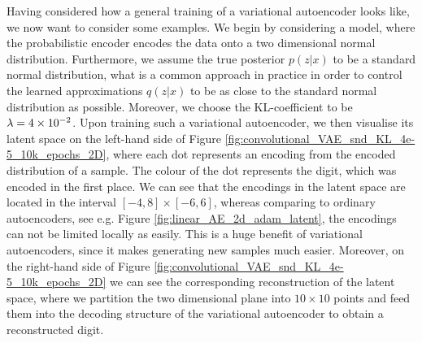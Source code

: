 Having considered how a general training of a variational autoencoder looks like, we now want to consider some examples. We begin by considering a model, where the probabilistic encoder encodes the data onto a two dimensional normal distribution. Furthermore, we assume the true posterior $p(z|x)$ to be a standard normal distribution, what is a common approach in practice in order to control the learned approximations $q(z|x)$ to be as close to the standard normal distribution as possible. Moreover, we choose the KL-coefficient to be $\lambda=\num{4e-2}$. Upon training such a variational autoencoder, we then visualise its latent space on the left-hand side of Figure \ref{fig:convolutional_VAE_snd_KL_4e-5_10k_epochs_2D}, where each dot represents an encoding from the encoded distribution of a sample. The colour of the dot represents the digit, which was encoded in the first place. We can see that the encodings in the latent space are located in the interval $[-4, 8]\times [-6, 6]$, whereas comparing to ordinary autoencoders, see e.g. Figure \ref{fig:linear_AE_2d_adam_latent}, the encodings can not be limited locally as easily. This is a huge benefit of variational autoencoders, since it makes generating new samples much easier. Moreover, on the right-hand side of Figure \ref{fig:convolutional_VAE_snd_KL_4e-5_10k_epochs_2D} we can see the corresponding reconstruction of the latent space, where we partition the two dimensional plane into $10\times 10$ points and feed them into the decoding structure of the variational autoencoder to obtain a reconstructed digit.


